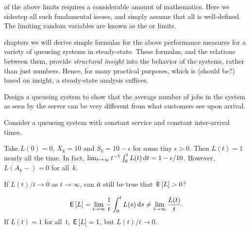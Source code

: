 \documentclass[queueing-book.tex]{subfiles}
\begin{document}
 of the above limits requires a considerable amount of mathematics.
Here we sidestep all such fundamental issues, and simply assume that all is well-defined.
The limiting random variables are known as the  or  limits.

 chapters we will derive simple formulas for the above performance measures for a variety of queueing systems in steady-state.
These formulas, and the relations between them, provide \emph{structural insight} into the behavior of the systems, rather than just numbers.
Hence, for many practical purposes, which is (should be?) based on insight, a steady-state analysis suffices.

\begin{exercise}\label{ex:l-165}
Design a queueing system to show that the average number of jobs in the system as seen by the server can be very different from what customers see upon arrival.
\begin{hint}
Consider a queueing system with constant service and constant inter-arrival times.
\end{hint}
\begin{solution}
 Take $L(0) = 0$, $X_k = 10$ and $S_k = 10-\epsilon$ for some tiny
 $\epsilon>0$. Then $L(t) = 1$ nearly all the time. In fact,
 $\lim_{t\to\infty}t^{-1}\int_0^t L(t) \,\textrm{d}t= 1-\epsilon/10$. However, $L(A_k-)=0$ for all~$k$.
\end{solution}
\end{exercise}


\begin{exercise}\label{ex:90}
 If $L(t)/t \to 0$ as $t\to\infty$, can it still be true that $\,\mathsf{E}\left[L\right]>0$?
\begin{solution}
 \begin{equation*}
 \,\mathsf{E}\left[L\right] = \lim_{t\to\infty} \frac 1 t \int_0^t L(s) \,\textrm{d}s \neq \lim_{t\to\infty} \frac{L(t)}t.
 \end{equation*}
If $L(t)=1$ for all~$t$, $\,\mathsf{E}\left[L\right] =1 $, but $L(t)/t \to 0$.
\end{solution}
\end{exercise}




\end{document}
